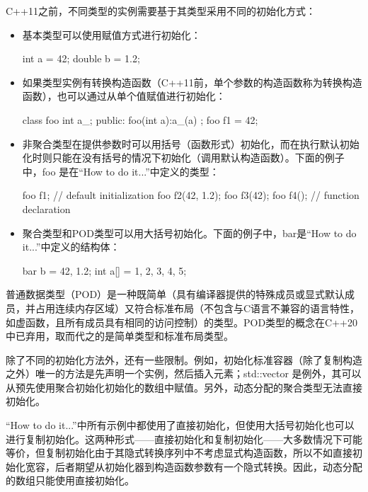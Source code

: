 
C++11之前，不同类型的实例需要基于其类型采用不同的初始化方式：

\begin{itemize}
\item
基本类型可以使用赋值方式进行初始化：

\begin{cpp}
int a = 42;
double b = 1.2;
\end{cpp}

\item
如果类型实例有转换构造函数（C++11前，单个参数的构造函数称为转换构造函数），也可以通过从单个值赋值进行初始化：

\begin{cpp}
class foo
{
    int a_;
    public:
    foo(int a):a_(a) {}
};
foo f1 = 42;
\end{cpp}

\item
非聚合类型在提供参数时可以用括号（函数形式）初始化，而在执行默认初始化时则只能在没有括号的情况下初始化（调用默认构造函数）。下面的例子中，foo 是在“How to do it...”中定义的类型：

\begin{cpp}
foo f1;           // default initialization
foo f2(42, 1.2);
foo f3(42);
foo f4();         // function declaration
\end{cpp}

\item
聚合类型和POD类型可以用大括号初始化。下面的例子中，bar是“How to do it...”中定义的结构体：

\begin{cpp}
bar b = {42, 1.2};
int a[] = {1, 2, 3, 4, 5};
\end{cpp}
\end{itemize}

\begin{myNotic}
普通数据类型（POD）是一种既简单（具有编译器提供的特殊成员或显式默认成员，并占用连续内存区域）又符合标准布局（不包含与C语言不兼容的语言特性，如虚函数，且所有成员具有相同的访问控制）的类型。POD类型的概念在C++20中已弃用，取而代之的是简单类型和标准布局类型。
\end{myNotic}

除了不同的初始化方法外，还有一些限制。例如，初始化标准容器（除了复制构造之外）唯一的方法是先声明一个实例，然后插入元素；std::vector 是例外，其可以从预先使用聚合初始化初始化的数组中赋值。另外，动态分配的聚合类型无法直接初始化。

“How to do it...”中所有示例中都使用了直接初始化，但使用大括号初始化也可以进行复制初始化。这两种形式——直接初始化和复制初始化——大多数情况下可能等价，但复制初始化由于其隐式转换序列中不考虑显式构造函数，所以不如直接初始化宽容，后者期望从初始化器到构造函数参数有一个隐式转换。因此，动态分配的数组只能使用直接初始化。

